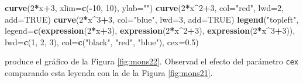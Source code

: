 \documentclass[
]{book}
\newenvironment{Shaded}{\begin{snugshade}}{\end{snugshade}}
\newcommand{\DataTypeTok}[1]{\textcolor[rgb]{0.13,0.29,0.53}{#1}}
\newcommand{\DecValTok}[1]{\textcolor[rgb]{0.00,0.00,0.81}{#1}}
\newcommand{\FloatTok}[1]{\textcolor[rgb]{0.00,0.00,0.81}{#1}}
\newcommand{\KeywordTok}[1]{\textcolor[rgb]{0.13,0.29,0.53}{\textbf{#1}}}
\newcommand{\NormalTok}[1]{#1}
\newcommand{\OperatorTok}[1]{\textcolor[rgb]{0.81,0.36,0.00}{\textbf{#1}}}
\newcommand{\OtherTok}[1]{\textcolor[rgb]{0.56,0.35,0.01}{#1}}
\newcommand{\StringTok}[1]{\textcolor[rgb]{0.31,0.60,0.02}{#1}}
\theoremstyle{definition}
\theoremstyle{definition}
\theoremstyle{definition}
\theoremstyle{remark}
\begin{document}
\begin{Shaded}
\begin{Highlighting}[]
\KeywordTok{curve}\NormalTok{(}\DecValTok{2}\OperatorTok{*}\NormalTok{x}\OperatorTok{+}\DecValTok{3}\NormalTok{, }\DataTypeTok{xlim=}\KeywordTok{c}\NormalTok{(}\OperatorTok{{-}}\DecValTok{10}\NormalTok{, }\DecValTok{10}\NormalTok{), }\DataTypeTok{ylab=}\StringTok{""}\NormalTok{)}
\KeywordTok{curve}\NormalTok{(}\DecValTok{2}\OperatorTok{*}\NormalTok{x}\OperatorTok{\^{}}\DecValTok{2}\OperatorTok{+}\DecValTok{3}\NormalTok{, }\DataTypeTok{col=}\StringTok{"red"}\NormalTok{, }\DataTypeTok{lwd=}\DecValTok{2}\NormalTok{, }\DataTypeTok{add=}\OtherTok{TRUE}\NormalTok{)}
\KeywordTok{curve}\NormalTok{(}\DecValTok{2}\OperatorTok{*}\NormalTok{x}\OperatorTok{\^{}}\DecValTok{3}\OperatorTok{+}\DecValTok{3}\NormalTok{, }\DataTypeTok{col=}\StringTok{"blue"}\NormalTok{, }\DataTypeTok{lwd=}\DecValTok{3}\NormalTok{, }\DataTypeTok{add=}\OtherTok{TRUE}\NormalTok{)}
\KeywordTok{legend}\NormalTok{(}\StringTok{"topleft"}\NormalTok{, }\DataTypeTok{legend=}\KeywordTok{c}\NormalTok{(}\KeywordTok{expression}\NormalTok{(}\DecValTok{2}\OperatorTok{*}\NormalTok{x}\OperatorTok{+}\DecValTok{3}\NormalTok{), }\KeywordTok{expression}\NormalTok{(}\DecValTok{2}\OperatorTok{*}\NormalTok{x}\OperatorTok{\^{}}\DecValTok{2}\OperatorTok{+}\DecValTok{3}\NormalTok{), }\KeywordTok{expression}\NormalTok{(}\DecValTok{2}\OperatorTok{*}\NormalTok{x}\OperatorTok{\^{}}\DecValTok{3}\OperatorTok{+}\DecValTok{3}\NormalTok{)), }
       \DataTypeTok{lwd=}\KeywordTok{c}\NormalTok{(}\DecValTok{1}\NormalTok{, }\DecValTok{2}\NormalTok{, }\DecValTok{3}\NormalTok{), }\DataTypeTok{col=}\KeywordTok{c}\NormalTok{(}\StringTok{"black"}\NormalTok{, }\StringTok{"red"}\NormalTok{, }\StringTok{"blue"}\NormalTok{), }\DataTypeTok{cex=}\FloatTok{0.5}\NormalTok{)}
\end{Highlighting}
\end{Shaded}

produce el gráfico de la Figura \ref{fig:mons22}. Observad el efecto del parámetro \texttt{cex} comparando esta leyenda con la de la Figura \ref{fig:mons21}.
\end{document}
